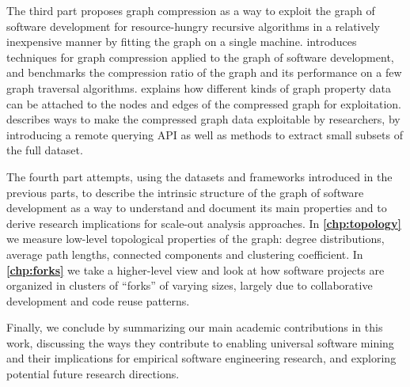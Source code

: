 The third part proposes graph compression as a way to exploit the graph of
software development for resource-hungry recursive algorithms in a relatively
inexpensive manner by fitting the graph on a single machine.
\textbf{} introduces techniques for graph
compression applied to the graph of software development, and benchmarks the
compression ratio of the graph and its performance on a few graph traversal
algorithms. \textbf{} explains how different kinds of
graph property data can be attached to the nodes and edges of the compressed
graph for exploitation. \textbf{} describes ways
to make the compressed graph data exploitable by researchers, by introducing a
remote querying API as well as methods to extract small subsets of the full
dataset.

The fourth part attempts, using the datasets and frameworks introduced in the
previous parts, to describe the intrinsic structure of the graph of software
development as a way to understand and document its main properties and to
derive research implications for scale-out analysis approaches. In
\textbf{\cref{chp:topology}} we measure low-level topological properties of the
graph: degree distributions, average path lengths, connected components and
clustering coefficient. In \textbf{\cref{chp:forks}} we take a higher-level
view and look at how software projects are organized in clusters of ``forks''
of varying sizes, largely due to collaborative development and code reuse
patterns.

Finally, we conclude by summarizing our main academic contributions in this
work, discussing the ways they contribute to enabling universal software mining
and their implications for empirical software engineering research, and
exploring potential future research directions.
